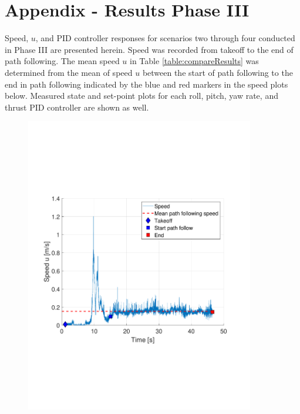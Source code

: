 \documentclass[numbered,pdftex]{ohio-etd}
\begin{document}
\chapter{Appendix - Results Phase III}

Speed, $u$, and PID controller responses for scenarios two through four conducted in Phase III are presented herein. Speed was recorded from takeoff to the end of path following. The mean speed $u$ in Table \ref{table:compareResults} was determined from the mean of speed $u$ between the start of path following to the end in path following indicated by the blue and red markers in the speed plots below. Measured state and set-point plots for each roll, pitch, yaw rate, and thrust PID controller are shown as well.

\begin{figure}[H]
	\centering
	\includegraphics[trim = 0 150 0 200, clip, width=10cm]{Figures/results/compareFigures/2u}


\end{figure}
\end{document}
